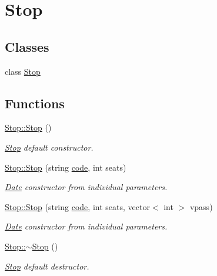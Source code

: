 \hypertarget{group___stop}{}\section{Stop}
\label{group___stop}
\subsection*{Classes}
\begin{DoxyCompactItemize}
\item 
class \hyperlink{class_stop}{Stop}
\end{DoxyCompactItemize}
\subsection*{Functions}
\begin{DoxyCompactItemize}
\item 
\mbox{\label{group___stop_gab8870f949c69cda03c4055524ed13c31}} 
\hyperlink{group___stop_gab8870f949c69cda03c4055524ed13c31}{Stop\+::\+Stop} ()
\begin{DoxyCompactList}\small\item\em \hyperlink{class_stop}{Stop} default constructor. \end{DoxyCompactList}\item 
\hyperlink{group___stop_gaa89c250884ae1407ac8647a8a3a58995}{Stop\+::\+Stop} (string \hyperlink{group___stop_ga5a0dddd108225fd437be86eed7b3a3ef}{code}, int seats)
\begin{DoxyCompactList}\small\item\em \hyperlink{class_date}{Date} constructor from individual parameters. \end{DoxyCompactList}\item 
\hyperlink{group___stop_ga843a7424de0129e7f6f066d2f8f1d1bc}{Stop\+::\+Stop} (string \hyperlink{group___stop_ga5a0dddd108225fd437be86eed7b3a3ef}{code}, int seats, vector$<$ int $>$ vpass)
\begin{DoxyCompactList}\small\item\em \hyperlink{class_date}{Date} constructor from individual parameters. \end{DoxyCompactList}\item 
\mbox{\label{group___stop_ga24e85edfa98a7a0212136679b6fad6d2}} 
\hyperlink{group___stop_ga24e85edfa98a7a0212136679b6fad6d2}{Stop\+::$\sim$\+Stop} ()
\begin{DoxyCompactList}\small\item\em \hyperlink{class_stop}{Stop} default destructor. \end{DoxyCompactList}\end{DoxyCompactItemize}
